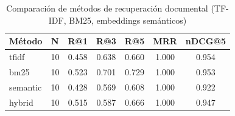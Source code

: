 \begin{table}[htbp]
\centering
\caption{Comparación de métodos de recuperación documental (TF-IDF, BM25, embeddings semánticos)}
\begin{tabular}{lcccccc}
\toprule
Método & N & R@1 & R@3 & R@5 & MRR & nDCG@5 \\
\midrule
tfidf & 10 & 0.458 & 0.638 & 0.660 & 1.000 & 0.954 \\
bm25 & 10 & 0.523 & 0.701 & 0.729 & 1.000 & 0.953 \\
semantic & 10 & 0.428 & 0.569 & 0.608 & 1.000 & 0.922 \\
hybrid & 10 & 0.515 & 0.587 & 0.666 & 1.000 & 0.947 \\
\bottomrule
\end{tabular}

\label{tab:rag-retrieval-comparison}
\end{table}
